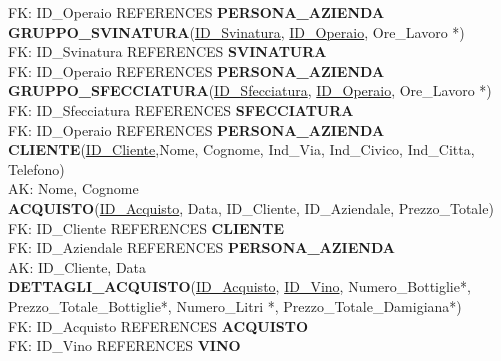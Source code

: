 \documentclass{article}
\begin{document}
FK: ID\_Operaio REFERENCES \textbf{PERSONA\_AZIENDA}\\\newline
\textbf{GRUPPO\_SVINATURA}(\underline{ID\_Svinatura}, \underline{ID\_Operaio}, Ore\_Lavoro *)\\
FK: ID\_Svinatura REFERENCES \textbf{SVINATURA}\\
FK: ID\_Operaio REFERENCES \textbf{PERSONA\_AZIENDA}\\\newline
\textbf{GRUPPO\_SFECCIATURA}(\underline{ID\_Sfecciatura}, \underline{ID\_Operaio}, Ore\_Lavoro *)\\
FK: ID\_Sfecciatura REFERENCES \textbf{SFECCIATURA}\\
FK: ID\_Operaio REFERENCES \textbf{PERSONA\_AZIENDA}\\\newline
\textbf{CLIENTE}(\underline{ID\_Cliente},Nome, Cognome, Ind\_Via, Ind\_Civico, Ind\_Citta, Telefono)\\
AK: Nome, Cognome\\\newline
\textbf{ACQUISTO}(\underline{ID\_Acquisto}, Data, ID\_Cliente, ID\_Aziendale, Prezzo\_Totale)\\
FK: ID\_Cliente REFERENCES \textbf{CLIENTE}\\
FK: ID\_Aziendale REFERENCES \textbf{PERSONA\_AZIENDA}\\
AK: ID\_Cliente, Data\\\newline
\textbf{DETTAGLI\_ACQUISTO}(\underline{ID\_Acquisto}, \underline{ID\_Vino}, Numero\_Bottiglie*, Prezzo\_Totale\_Bottiglie*, Numero\_Litri *,  Prezzo\_Totale\_Damigiana*)\\
FK: ID\_Acquisto REFERENCES \textbf{ACQUISTO}\\
FK: ID\_Vino REFERENCES \textbf{VINO}
\end{document}
